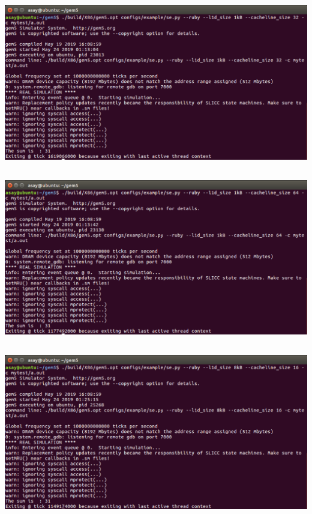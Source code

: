 \documentclass{article}
\begin{document}
\subsection*{}
\begin{center}
	\includegraphics[width=1\textwidth]{cacheline32}
\end{center}
\subsection*{}
\begin{center}
	\includegraphics[width=1\textwidth]{cacheline64}
\end{center}
\subsection*{}
\begin{center}
	\includegraphics[width=1\textwidth]{816}
\end{center}
\end{document}
